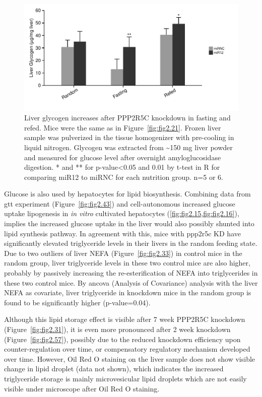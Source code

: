 \begin{figure}[htbp]
\centering
\includegraphics[width=1\textwidth]{figs/fig2-30 liver glycogen.pdf}
\caption[Liver glycogen increases after PPP2R5C KD]{\footnotesize Liver glycogen increases after PPP2R5C knockdown in fasting and refed. Mice were the same as in Figure~\ref{fig:fig2.21}. Frozen liver sample was pulverized in the tissue homogenizer with pre-cooling in liquid nitrogen. Glycogen was extracted from \textasciitilde150 mg liver powder and measured for glucose level after overnight amyloglucosidase digestion. * and ** for p-value<0.05 and 0.01 by t-test in R for comparing miR12 to miRNC for each nutrition group. n=5 or 6. }
\label{fig:fig2.30}
\end{figure}

Glucose is also used by hepatocytes for lipid biosynthesis. Combining data from \gls{gtt} experiment (Figure~\ref{fig:fig2.43}) and cell-autonomous increased glucose uptake lipogenesis in \textit{in vitro} cultivated hepatocytes (\cref{fig:fig2.15,fig:fig2.16}), implies the increased glucose uptake in the liver would also possibly shunted into lipid synthesis pathway. In agreement with this, mice with \gls{ppp2r5c} KD have significantly elevated triglyceride levels in their livers in the random feeding state. Due to two outliers of liver NEFA (Figure~\ref{fig:fig2.33}) in control mice in the random group, liver triglyceride levels in these two control mice are also higher, probably by passively increasing the re-esterification of NEFA into triglycerides in these two control mice. By \gls{ancova} (Analysis of Covariance) analysis with the liver NEFA as covariate, liver triglyceride in knockdown mice in the random group is found to be significantly higher (p-value=0.04). 

Although this lipid storage effect is visible after 7 week PPP2R5C knockdown (Figure~\ref{fig:fig2.31}), it is even more pronounced after 2 week knockdown (Figure~\ref{fig:fig2.57}), possibly due to the reduced knockdown efficiency upon counter-regulation over time, or compensatory regulatory mechanism developed over time. However, Oil Red O staining on the liver sample does not show visible change in lipid droplet (data not shown), which indicates the increased triglyceride storage is mainly microvesicular lipid droplets which are not easily visible under microscope after Oil Red O staining. 

